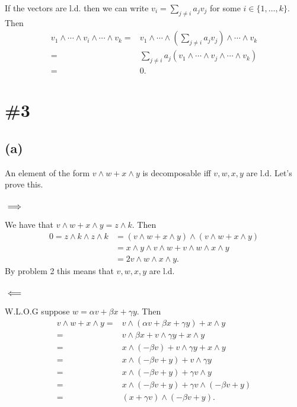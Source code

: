 \documentclass{article}
\begin{document}
If the vectors are l.d. then we can write $v_i=\sum_{j\neq i}a_jv_j$ for some
$i\in\{1,\dots,k\}$. Then
\begin{align*}
	v_1\wedge\cdots\wedge v_i \wedge\cdots\wedge v_k =&
	v_1\wedge\cdots\wedge \left(\sum_{j\neq i}a_jv_j\right) \wedge\cdots\wedge v_k\\
	=& \sum_{j\neq i}a_j \left(v_1\wedge\cdots\wedge v_j \wedge\cdots\wedge v_k\right)\\
	=& 0.
\end{align*}
\section*{\#3}

\subsection*{(a)}
An element of the form $v\wedge w +x\wedge y$ is decomposable iff $v,w,x,y$ are l.d. Let's prove this.
\subsubsection*{$\implies$}
We have that $v\wedge w +x\wedge y=z\wedge k$. Then
\begin{align*}
	0=z\wedge k\wedge z\wedge k&=(v\wedge w +x\wedge y) \wedge (v\wedge w +x\wedge y)\\
	&=x\wedge y \wedge v \wedge w + v \wedge w \wedge x\wedge y\\
	&=2v \wedge w \wedge x\wedge y.
\end{align*}
By problem 2 this means that $v,w,x,y$ are l.d.
\subsubsection*{$\impliedby$}
W.L.O.G suppose $w=\alpha v+\beta x+\gamma y$. Then
\begin{align*}
	v\wedge w + x\wedge y =&
	v\wedge(\alpha v + \beta x + \gamma y) + x\wedge y\\
	=& v\wedge\beta x + v\wedge\gamma y + x\wedge y\\
	=& x\wedge(-\beta v) + v\wedge\gamma y + x\wedge y\\
	=& x\wedge(-\beta v+y) + v\wedge\gamma y \\
	=& x\wedge(-\beta v+y) + \gamma v\wedge y \\
	=& x\wedge(-\beta v+y) + \gamma v\wedge(-\beta v + y) \\
	=& (x+\gamma v)\wedge(-\beta v+y).
\end{align*}
\end{document}
